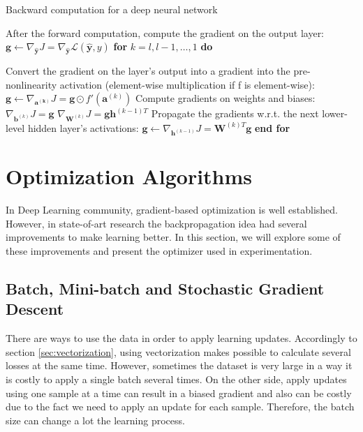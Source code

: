 \begin{algorithm}[!htbp]
	\caption{Backward computation for a deep neural network}
	\begin{algorithmic} 
		\STATE After the forward computation, compute the gradient on the output layer:
		\STATE $\boldsymbol{g} \leftarrow \nabla_{\boldsymbol{\hat{y}}}J = \nabla_{\boldsymbol{\hat{y}}}\mathcal{L}(\boldsymbol{\hat{y}},y)$
		\STATE \textbf{for} $k = l, l - 1,
		 \dots, 1$ \textbf{do}
		
		\STATE \hspace{5mm} Convert the gradient on the layer’s output into a gradient into the pre-nonlinearity activation (element-wise multiplication if f is element-wise):
		\STATE \hspace{5mm} $\boldsymbol{g} \leftarrow \nabla_{\boldsymbol{a^{(k)}}}J = \boldsymbol{g} \odot f'(\boldsymbol{a}^{(k)})$
		\STATE \hspace{5mm} Compute gradients on weights and biases:
		\STATE \hspace{5mm} $\nabla_{\boldsymbol{b}^{(k)}}J = \boldsymbol{g}$
		\STATE \hspace{5mm} $\nabla_{\boldsymbol{W}^{(k)}}J = \boldsymbol{g} \boldsymbol{h}^{(k-1)T}$
		\STATE \hspace{5mm} Propagate the gradients w.r.t. the next lower-level hidden layer’s activations:		
		\STATE \hspace{5mm} $\boldsymbol{g} \leftarrow \nabla_{\boldsymbol{h}^{(k - 1)}}J = \boldsymbol{W}^{(k)T}\boldsymbol{g}$
		\STATE \textbf{end for}
	\end{algorithmic}
	\label{alg:backprop}
\end{algorithm}

\section{Optimization Algorithms}
In Deep Learning community, gradient-based optimization is well established. However, in state-of-art research the backpropagation idea had several improvements to make learning better. In this section, we will explore some of these improvements and present the optimizer used in experimentation.

\subsection{Batch, Mini-batch and Stochastic Gradient Descent}
There are ways to use the data in order to apply learning updates. Accordingly to section \ref{sec:vectorization}, using vectorization makes possible to calculate several losses at the same time. However, sometimes the dataset is very large in a way it is costly to apply a single batch several times. On the other side, apply updates using one sample at a time can result in a biased gradient and also can be costly due to the fact we need to apply an update for each sample. Therefore, the batch size can change a lot the learning process.

